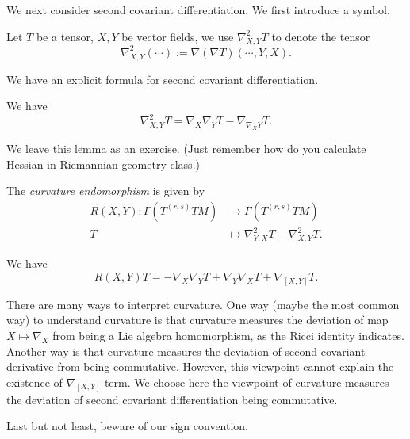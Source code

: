 We next consider second covariant differentiation.
We first introduce a symbol.

\begin{defn}
    Let $T$ be a tensor, $X,Y$ be vector fields, we use $\nabla_{X,Y}^2T$ to denote the tensor
    \[\nabla^2_{X,Y}(\cdots):=\nabla(\nabla T)(\cdots,Y,X).\]
\end{defn}

We have an explicit formula for second covariant differentiation.

\begin{lem}\label{lem:second covdiff}
    We have
    \[\nabla_{X,Y}^2T=\nabla_X\nabla_YT-\nabla_{\nabla_XY}T.\]
\end{lem}

We leave this lemma as an exercise.
(Just remember how do you calculate Hessian in Riemannian geometry class.)

\begin{defn}
    The \emph{curvature endomorphism} is given by
    \begin{align*}
        R(X,Y):\Gamma\left(T^{(r,s)}TM\right)&\to\Gamma\left(T^{(r,s)}TM\right)\\
        T&\mapsto\nabla^2_{Y,X}T-\nabla^2_{X,Y}T.
    \end{align*}
\end{defn}

\begin{prop}
    We have
    \[R(X,Y)T=-\nabla_X\nabla_YT+\nabla_Y\nabla_XT+\nabla_{[X,Y]}T.\]
\end{prop}

\begin{rem}
    There are many ways to interpret curvature.
    One way (maybe the most common way) to understand curvature is that curvature measures the deviation of map $X\mapsto\nabla_X$ from being a Lie algebra homomorphism, as the Ricci identity indicates.
    Another way is that curvature measures the deviation of second covariant derivative from being commutative.
    However, this viewpoint cannot explain the existence of $\nabla_{[X,Y]}$ term.
    We choose here the viewpoint of curvature measures the deviation of second covariant differentiation being commutative.

    Last but not least, beware of our sign convention.
\end{rem}